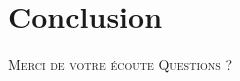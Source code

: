 \documentclass{cubeamer}
\begin{document}
\section{Conclusion}



\begin{frame}[standout]
    \Huge\textsc{Merci de votre écoute}
    \vfill
    \LARGE\textsc{Questions ?}
\end{frame}
\end{document}

